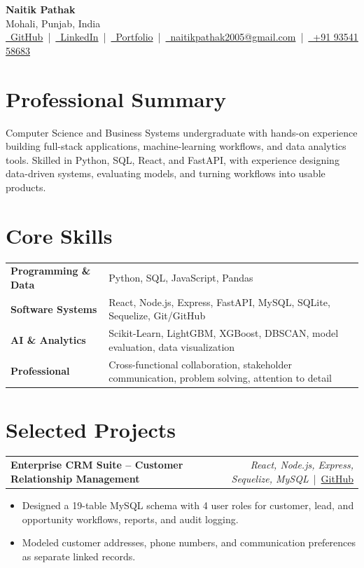 \documentclass[a4paper,10pt]{article}
\begin{document}
\pagestyle{empty}

\begin{center}
{\LARGE\textbf{Naitik Pathak}}\\[3pt]
Mohali, Punjab, India\\[3pt]
\small
\href{https://github.com/naitik24-code}{\faGithub\ GitHub} \,|\,
\href{https://www.linkedin.com/in/naitik-pathak/}{\faLinkedin\ LinkedIn} \,|\,
\href{https://portfolio-six-lake-30.vercel.app/}{\faGlobe\ Portfolio} \,|\,
\href{mailto:naitikpathak2005@gmail.com}{\faEnvelope\ naitikpathak2005@gmail.com} \,|\,
\href{tel:+919354158683}{\faMobile\ +91 93541 58683}
\end{center}
\vspace{-4pt}
\normalsize

\section{Professional Summary}
Computer Science and Business Systems undergraduate with hands-on experience building full-stack applications, machine-learning workflows, and data analytics tools. Skilled in Python, SQL, React, and FastAPI, with experience designing data-driven systems, evaluating models, and turning workflows into usable products.
\section{Core Skills}
\begin{tabularx}{\linewidth}{@{}lX@{}}
\textbf{Programming \& Data} & Python, SQL, JavaScript, Pandas \\
\textbf{Software Systems} & React, Node.js, Express, FastAPI, MySQL, SQLite, Sequelize, Git/GitHub \\
\textbf{AI \& Analytics} & Scikit-Learn, LightGBM, XGBoost, DBSCAN, model evaluation, data visualization \\
\textbf{Professional} & Cross-functional collaboration, stakeholder communication, problem solving, attention to detail
\end{tabularx}
\section{Selected Projects}
\begin{tabularx}{\linewidth}{@{}Xr@{}}\textbf{Enterprise CRM Suite -- Customer Relationship Management} & \textit{React, Node.js, Express, Sequelize, MySQL} \,|\, \href{https://github.com/naitikp2002/Customer_Relationship_Database}{GitHub}\end{tabularx}
\begin{itemize}\item Designed a 19-table MySQL schema with 4 user roles for customer, lead, and opportunity workflows, reports, and audit logging.\item Modeled customer addresses, phone numbers, and communication preferences as separate linked records.\end{itemize}
\end{document}
